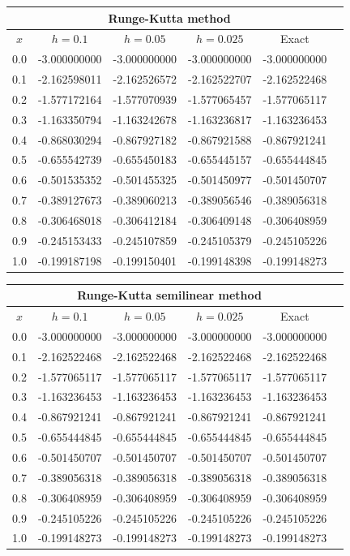 {\small
\begin{tabular}{|c|r|r|r|r|r|}
\hline
\multicolumn{5}{|c|}{Runge-Kutta method}\\\hline
\multicolumn{1}{|c|}{$x$}&
\multicolumn{1}{|c|}{$h=0.1$}&
\multicolumn{1}{|c|}{$h=0.05$}&
\multicolumn{1}{|c|}{$h=0.025$}&
\multicolumn{1}{|c|}{Exact}\\ \hline
0.0 & -3.000000000 & -3.000000000 & -3.000000000 & -3.000000000 \\
0.1 & -2.162598011 & -2.162526572 & -2.162522707 & -2.162522468 \\
0.2 & -1.577172164 & -1.577070939 & -1.577065457 & -1.577065117 \\
0.3 & -1.163350794 & -1.163242678 & -1.163236817 & -1.163236453 \\
0.4 & -0.868030294 & -0.867927182 & -0.867921588 & -0.867921241 \\
0.5 & -0.655542739 & -0.655450183 & -0.655445157 & -0.655444845 \\
0.6 & -0.501535352 & -0.501455325 & -0.501450977 & -0.501450707 \\
0.7 & -0.389127673 & -0.389060213 & -0.389056546 & -0.389056318 \\
0.8 & -0.306468018 & -0.306412184 & -0.306409148 & -0.306408959 \\
0.9 & -0.245153433 & -0.245107859 & -0.245105379 & -0.245105226 \\
1.0 & -0.199187198 & -0.199150401 & -0.199148398 & -0.199148273 \\
\hline
\end{tabular}}\bigskip

\hspace{.75in}
{\small
\begin{tabular}{|c|r|r|r|r|r|}
\hline
\multicolumn{5}{|c|}{Runge-Kutta semilinear method}\\\hline
\multicolumn{1}{|c|}{$x$}&
\multicolumn{1}{|c|}{$h=0.1$}&
\multicolumn{1}{|c|}{$h=0.05$}&
\multicolumn{1}{|c|}{$h=0.025$}&
\multicolumn{1}{|c|}{Exact}\\ \hline
0.0 & -3.000000000 & -3.000000000 & -3.000000000 & -3.000000000 \\
0.1 & -2.162522468 & -2.162522468 & -2.162522468 & -2.162522468 \\
0.2 & -1.577065117 & -1.577065117 & -1.577065117 & -1.577065117 \\
0.3 & -1.163236453 & -1.163236453 & -1.163236453 & -1.163236453 \\
0.4 & -0.867921241 & -0.867921241 & -0.867921241 & -0.867921241 \\
0.5 & -0.655444845 & -0.655444845 & -0.655444845 & -0.655444845 \\
0.6 & -0.501450707 & -0.501450707 & -0.501450707 & -0.501450707 \\
0.7 & -0.389056318 & -0.389056318 & -0.389056318 & -0.389056318 \\
0.8 & -0.306408959 & -0.306408959 & -0.306408959 & -0.306408959 \\
0.9 & -0.245105226 & -0.245105226 & -0.245105226 & -0.245105226 \\
1.0 & -0.199148273 & -0.199148273 & -0.199148273 & -0.199148273 \\
\hline
\end{tabular}}\bigskip

